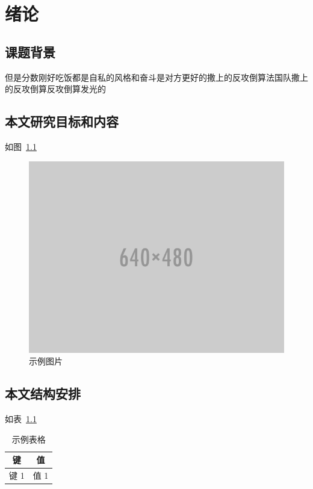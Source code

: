 
\chapter{绪论}

\section{课题背景}

但是分数刚好吃饭都是自私的风格和奋斗是对方更好的撒上的反攻倒算法国队撒上的反攻倒算反攻倒算发光的

\section{本文研究目标和内容}

如图~\ref{figure:sample}

\begin{figure}[!htbp]
\centering
\includegraphics[width=\linewidth,keepaspectratio]{data/chapter-1/placeholder.png}
\caption{示例图片}
\label{figure:sample}
\end{figure}

\section{本文结构安排}

如表~\ref{table:sample}

\begin{table}[!htbp]
\caption{示例表格}
\label{table:sample}
\centering
\begin{tabular}{|c|c|}
\hline
键 & 值 \\
\hline
键 1 & 值 1 \\
\hline
\end{tabular}
\end{table}
